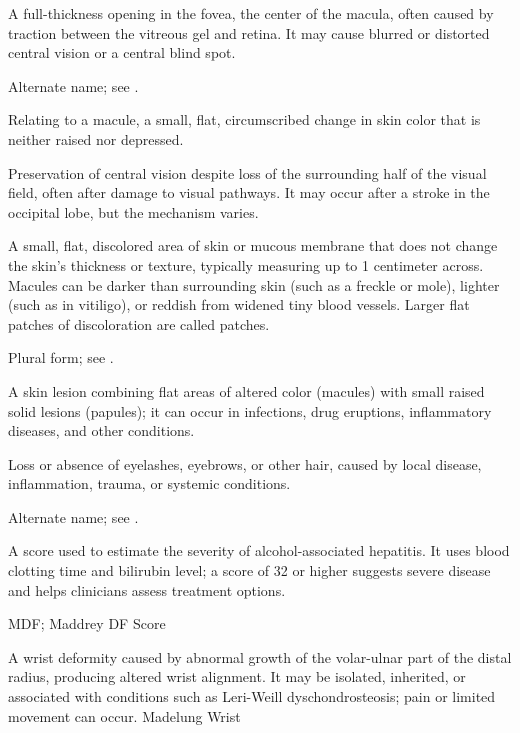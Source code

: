  A full-thickness opening in the fovea, the center of the macula, often caused by traction between the vitreous gel and retina. It may cause blurred or distorted central vision or a central blind spot.

 Alternate name; see .

 Relating to a macule, a small, flat, circumscribed change in skin color that is neither raised nor depressed.

 Preservation of central vision despite loss of the surrounding half of the visual field, often after damage to visual pathways. It may occur after a stroke in the occipital lobe, but the mechanism varies.

 A small, flat, discolored area of skin or mucous membrane that does not change the skin's thickness or texture, typically measuring up to 1 centimeter across. Macules can be darker than surrounding skin (such as a freckle or mole), lighter (such as in vitiligo), or reddish from widened tiny blood vessels. Larger flat patches of discoloration are called patches.

 Plural form; see .

 A skin lesion combining flat areas of altered color (macules) with small raised solid lesions (papules); it can occur in infections, drug eruptions, inflammatory diseases, and other conditions.

 Loss or absence of eyelashes, eyebrows, or other hair, caused by local disease, inflammation, trauma, or systemic conditions.

 Alternate name; see .

 A score used to estimate the severity of alcohol-associated hepatitis. It uses blood clotting time and bilirubin level; a score of 32 or higher suggests severe disease and helps clinicians assess treatment options.

\synonyms
MDF; Maddrey DF Score

 A wrist deformity caused by abnormal growth of the volar-ulnar part of the distal radius, producing altered wrist alignment. It may be isolated, inherited, or associated with conditions such as Leri-Weill dyschondrosteosis; pain or limited movement can occur.
\synonyms
Madelung Wrist

